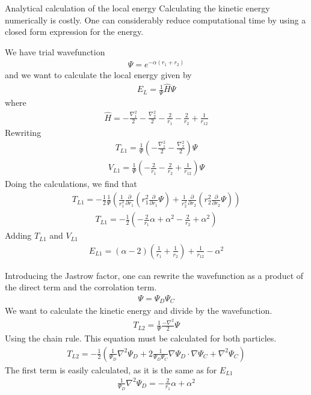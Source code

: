 \documentclass[a4paper, 12pt, titlepage]{article}
\begin{document}
\appendix
\begin{section}{Analytical calculation of the local energy}\label{App:AppendixA}
 Calculating the kinetic energy numerically is costly. One can considerably reduce computational time by using a closed form expression for the energy. 

 We have trial wavefunction 
 \begin{align*}
 	\Psi = e^{-\alpha(r_1 + r_2)}
 \end{align*}
 and we want to calculate the local energy given by
 \begin{align*}
 	E_L = \frac{1}{\Psi} \hat H \Psi
 \end{align*}
 where
 \begin{align*}
 	\hat H = -\frac{\nabla_1^2}{2} - \frac{\nabla_2^2}{2} - \frac{2}{r_1} - \frac{2}{r_2} + \frac{1}{r_{12}}
 \end{align*}
 Rewriting	
 \begin{align*}
 	T_{L1} = \frac{1}{\Psi} \left( -\frac{\nabla_1^2}{2} - \frac{\nabla_2^2}{2} \right) \Psi
 \end{align*}
 \begin{align*}
 	V_{L1} = \frac{1}{\Psi} \left( - \frac{2}{r_1} - \frac{2}{r_2} + \frac{1}{r_{12}} \right) \Psi
 \end{align*}
 Doing the calculations, we find that
 \begin{align*}
 	T_{L1} = -\frac{1}{2} \frac{1}{\Psi} \left( \frac{1}{r_1^2} \frac{\partial}{\partial r_1} \left( r_1^2 \frac{\partial}{\partial r_1} \Psi \right) + \frac{1}{r_2^2} \frac{\partial}{\partial r_2} \left( r_2^2 \frac{\partial}{\partial r_2} \Psi \right) \right)
 \end{align*}
 \begin{align*}
 	T_{L1} = -\frac{1}{2} \left( -\frac{2}{r_1}\alpha + \alpha^2 - \frac{2}{r_2} + \alpha^2 \right)
 \end{align*}
 Adding $T_{L1}$ and $V_{L1}$ 
 \begin{align*}
 	E_{L1} = \left( \alpha - 2 \right) \left( \frac{1}{r_1} + \frac{1}{r_2} \right) + \frac{1}{r_{12}} - \alpha^2 
 \end{align*}

 Introducing the Jastrow factor, one can rewrite the wavefunction
 as a product of the direct term and the corrolation term. 
 \begin{align*}
 	\Psi = \Psi_D \Psi_C
 \end{align*}
 We want to calculate the kinetic energy and divide by the wavefunction.
 \begin{align*}
 	T_{L2} = \frac{1}{\Psi} \frac{-\nabla^2}{2} \Psi
 \end{align*}
 Using the chain rule. This equation must be calculated for both particles. 
 \begin{align}
 	T_{L2} = -\frac{1}{2} \left( \frac{1}{\Psi_D}\nabla^2 \Psi_D + 2 \frac{1}{\Psi_D \Psi_C} \nabla \Psi_D \cdot \nabla \Psi_C + \nabla^2 \Psi_C \right)
 	\label{T_L2}
 \end{align}
 The first term is easily calculated, as it is the same as for $E_{L1}$
 \begin{align*}
 	\frac{1}{\Psi_D}\nabla^2 \Psi_D =  -\frac{2}{r_1}\alpha + \alpha^2 
 \end{align*}


\end{section}
\end{document}
